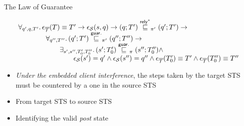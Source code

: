 \documentclass[aspectratio=169,xcolor=dvipsnames]{beamer}
\begin{document}
\begin{frame}{The Law of Guarantee}\scriptsize
    \begin{theorem} 
\[
\begin{array}{l}
\forall_{q',q, T'} \ldotp 
    \epsilon_{\overline{\mathcal{T}}} ( T) \equiv T' \rightarrow \epsilon_{\mathcal{S}}(s,q)
\rightarrow   (q;T')\overset{\mathsf{rely}^{*}}{\sqsubseteq}_{\pi'}(q';T') \rightarrow  \\
\quad\quad\quad\quad \forall_{q'',T''}\ldotp (q';T')\overset{\mathsf{guar.}}{\sqsubseteq}_{\pi'}(q'';T'') \rightarrow  \\
\quad\quad\quad\quad\quad\quad \exists_{s',s'',T'_0,T''_0} \ldotp (s';T'_0) \overset{\mathsf{guar.}}{\sqsubseteq}_{\pi} (s'';T''_0) \land \\ \quad\quad\quad\quad\quad\quad\quad\quad \epsilon_{\mathcal{S}}(s')=q' \land \epsilon_{\mathcal{S}}(s'') = q'' \land \epsilon_{\overline{\mathcal{T}}}(T'_0) \equiv T' \land \epsilon_{\overline{\mathcal{T}}}(T''_0) \equiv T''
 \end{array}
\]
\end{theorem}
\begin{itemize}
    \item \emph{Under the embedded client interference}, the steps taken by the target STS must be countered by a one in the source STS
    \item From target STS to source STS
    \item Identifying the valid \emph{post} state 
\end{itemize}
\end{frame}
\end{document}

